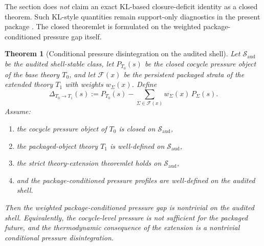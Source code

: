\documentclass[11pt]{article}
\newtheorem{theorem}{Theorem}[section]
\theoremstyle{definition}
\newcommand{\Tzero}{T_0}
\newcommand{\Tone}{T_1}
\begin{document}
The section does \emph{not} claim an exact KL-based closure-deficit identity as a closed theorem. Such KL-style quantities remain support-only diagnostics in the present package \cite{CoverThomas2006InfoTheory,TsiokosCastStone}. The closed theoremlet is formulated on the weighted package-conditioned pressure gap itself.

\begin{theorem}[Conditional pressure disintegration on the audited shell]\label{thm:conditional-disintegration}
Let \(\mathcal{S}_{\mathrm{aud}}\) be the audited shell-stable class, let \(P_{\Tzero}(s)\) be the closed cocycle pressure object of the base theory \(\Tzero\), and let \(\mathcal{F}(x)\) be the persistent packaged strata of the extended theory \(\Tone\) with weights \(w_{\Sigma}(x)\). Define
\[
\Delta_{\Tzero\to \Tone}(s)
:=
P_{\Tzero}(s)
-
\sum_{\Sigma\in\mathcal{F}(x)} w_{\Sigma}(x)\,P_{\Sigma}(s).
\]
Assume:
\begin{enumerate}
    \item the cocycle pressure object of \(\Tzero\) is closed on \(\mathcal{S}_{\mathrm{aud}}\),
    \item the packaged-object theory \(\Tone\) is well-defined on \(\mathcal{S}_{\mathrm{aud}}\),
    \item the strict theory-extension theoremlet holds on \(\mathcal{S}_{\mathrm{aud}}\),
    \item and the package-conditioned pressure profiles are well-defined on the audited shell.
\end{enumerate}
Then the weighted package-conditioned pressure gap is nontrivial on the audited shell. Equivalently, the cocycle-level pressure is not sufficient for the packaged future, and the thermodynamic consequence of the extension is a nontrivial conditional pressure disintegration.
\end{theorem}
\end{document}
